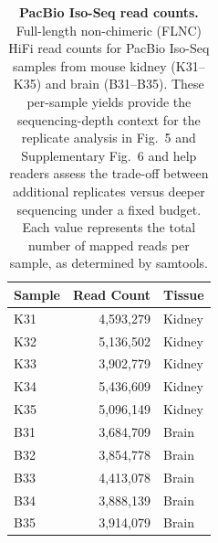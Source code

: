 {  %
  \begin{table}[htbp]
      \centering
      \caption{\textbf{PacBio Iso-Seq read counts.} Full-length non-chimeric (FLNC) HiFi read counts for PacBio Iso-Seq samples from mouse kidney (K31--K35) and brain (B31--B35). These per-sample yields provide the sequencing-depth context for the replicate analysis in Fig.~5 and Supplementary Fig.~6 and help readers assess the trade-off between additional replicates versus deeper sequencing under a fixed budget. Each value represents the total number of mapped reads per sample, as determined by samtools.}
      \label{tab:4}
      \begin{tabular*}{\textwidth}{@{\extracolsep{\fill}}lrl@{}}
          \toprule
          Sample & Read Count & Tissue \\
          \midrule
          K31 & 4,593,279 & Kidney \\
          K32 & 5,136,502 & Kidney \\
          K33 & 3,902,779 & Kidney \\
          K34 & 5,436,609 & Kidney \\
          K35 & 5,096,149 & Kidney \\
          B31 & 3,684,709 & Brain \\
          B32 & 3,854,778 & Brain \\
          B33 & 4,413,078 & Brain \\
          B34 & 3,888,139 & Brain \\
          B35 & 3,914,079 & Brain \\
          \bottomrule
      \end{tabular*}
  \end{table}
}

\ifdefined\SupplementMaster
  \SupplementTablesContent
\else

\documentclass[pdflatex,sn-nature]{sn-jnl}%

\usepackage{graphicx}
\usepackage{multirow}
\usepackage{amsmath,amssymb,amsfonts}
\usepackage{amsthm}
\usepackage{mathrsfs}
\usepackage[title]{appendix}
\usepackage{xcolor}
\usepackage{textcomp}
\usepackage{manyfoot}
\usepackage{booktabs}
\usepackage{hyperref}
\usepackage{cleveref}
\usepackage{ragged2e}
\usepackage{caption}

\captionsetup{
  font=small,
  labelfont=bf,
  labelsep=colon,
  justification=justified,
  singlelinecheck=false
}

\raggedbottom



